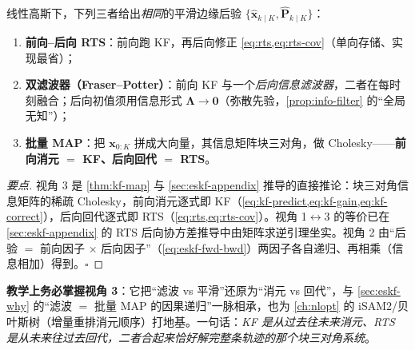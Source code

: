 \begin{theorem}\label{thm:rts-views}
线性高斯下，下列三者给出\emph{相同}的平滑边缘后验 $\{\hat{\mathbf{x}}_{k\mid K},\hat{\mathbf{P}}_{k\mid K}\}$\cite{barfoot2024state,sarkka2013bayesian}：
\begin{enumerate}
  \item \textbf{前向--后向 RTS}：前向跑 KF，再后向修正 \cref{eq:rts,eq:rts-cov}（单向存储、实现最省）；
  \item \textbf{双滤波器（Fraser--Potter）}：前向 KF 与一个\emph{后向信息滤波器}，二者在每时刻融合；后向初值须用信息形式 $\boldsymbol{\Lambda}\to\boldsymbol{0}$（弥散先验，\cref{prop:info-filter} 的“全局无知”）；
  \item \textbf{批量 MAP}：把 $\mathbf{x}_{0:K}$ 拼成大向量，其信息矩阵块三对角，做 Cholesky——\textbf{前向消元 $=$ KF、后向回代 $=$ RTS}。
\end{enumerate}
\end{theorem}
\begin{proof}[要点]
视角 3 是 \cref{thm:kf-map} 与 \cref{sec:eskf-appendix} 推导的直接推论：块三对角信息矩阵的稀疏 Cholesky，前向消元逐式即 KF（\cref{eq:kf-predict,eq:kf-gain,eq:kf-correct}），后向回代逐式即 RTS（\cref{eq:rts,eq:rts-cov}）。视角 1$\leftrightarrow$3 的等价已在 \cref{sec:eskf-appendix} 的 RTS 后向协方差推导中由矩阵求逆引理坐实。视角 2 由“后验 $=$ 前向因子 $\times$ 后向因子”（\cref{eq:eskf-fwd-bwd}）两因子各自递归、再相乘（信息相加）得到。\hfill$\square$
\end{proof}

\begin{insight}
\textbf{教学上务必掌握视角 3}：它把“滤波 vs 平滑”还原为“消元 vs 回代”，与 \cref{sec:eskf-why} 的“滤波 $=$ 批量 MAP 的因果递归”一脉相承，也为 \cref{ch:nlopt} 的 iSAM2/贝叶斯树（增量重排消元顺序）打地基。一句话：\emph{KF 是从过去往未来消元、RTS 是从未来往过去回代，二者合起来恰好解完整条轨迹的那个块三对角系统}。
\end{insight}

